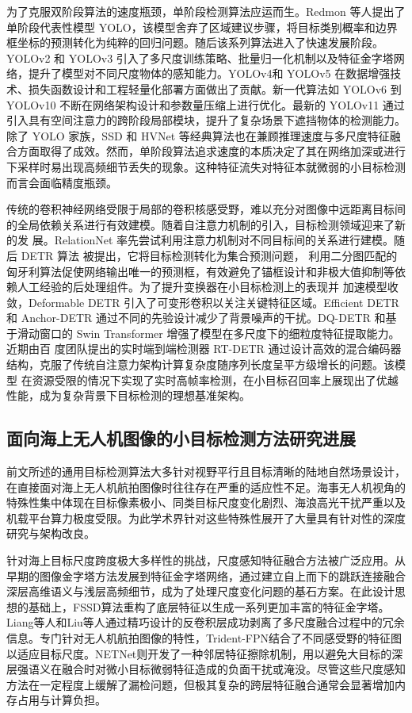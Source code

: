 为了克服双阶段算法的速度瓶颈，单阶段检测算法应运而生。Redmon 等人\cite{ref9}提出了单阶段代表性模型 YOLO，该模型舍弃了区域建议步骤，将目标类别概率和边界框坐标的预测转化为纯粹的回归问题。随后该系列算法进入了快速发展阶段。YOLOv2\cite{ref10} 和 YOLOv3\cite{ref11} 引入了多尺度训练策略、批量归一化机制以及特征金字塔网络，提升了模型对不同尺度物体的感知能力。YOLOv4\cite{ref12}和 YOLOv5\cite{ref13} 在数据增强技术、损失函数设计和工程轻量化部署方面做出了贡献。新一代算法如 YOLOv6\cite{ref14} 到 YOLOv10\cite{ref18} 不断在网络架构设计和参数量压缩上进行优化。最新的 YOLOv11 通过引入具有空间注意力的跨阶段局部模块，提升了复杂场景下遮挡物体的检测能力。除了 YOLO 家族，SSD\cite{ref19} 和 HVNet\cite{ref20} 等经典算法也在兼顾推理速度与多尺度特征融合方面取得了成效。然而，单阶段算法追求速度的本质决定了其在网络加深或进行下采样时易出现高频细节丢失的现象。这种特征流失对特征本就微弱的小目标检测而言会面临精度瓶颈。


传统的卷积神经网络受限于局部的卷积核感受野，难以充分对图像中远距离目标间的全局依赖关系进行有效建模。随着自注意力机制的引入，目标检测领域迎来了新的发
展。RelationNet\cite{ref21} 率先尝试利用注意力机制对不同目标间的关系进行建模。随后 DETR 算法\cite{ref22} 被提出，它将目标检测转化为集合预测问题，
利用二分图匹配的匈牙利算法促使网络输出唯一的预测框，有效避免了锚框设计和非极大值抑制等依赖人工经验的后处理组件。为了提升变换器在小目标检测上的表现并
加速模型收敛，Deformable DETR\cite{ref23} 引入了可变形卷积以关注关键特征区域。Efficient DETR\cite{ref24} 和 Anchor-DETR\cite{ref25} 通过不同的先验设计减少了背景噪声的干扰。DQ-DETR\cite{ref26} 和基于滑动窗口的 Swin Transformer\cite{ref27} 增强了模型在多尺度下的细粒度特征提取能力。近期由百
度团队提出的实时端到端检测器 RT-DETR\cite{ref28} 通过设计高效的混合编码器结构，克服了传统自注意力架构计算复杂度随序列长度呈平方级增长的问题。该模型
在资源受限的情况下实现了实时高帧率检测，在小目标召回率上展现出了优越性能，成为复杂背景下目标检测的理想基准架构。

\subsection{面向海上无人机图像的小目标检测方法研究进展}

前文所述的通用目标检测算法大多针对视野平行且目标清晰的陆地自然场景设计，在直接面对海上无人机航拍图像时往往存在严重的适应性不足。海事无人机视角的特殊性集中体现在目标像素极小、同类目标尺度变化剧烈、海浪高光干扰严重以及机载平台算力极度受限。为此学术界针对这些特殊性展开了大量具有针对性的深度研究与架构改良。

针对海上目标尺度跨度极大多样性的挑战，尺度感知特征融合方法被广泛应用。从早期的图像金字塔\cite{ref29, ref30}方法发展到特征金字塔网络\cite{ref31}，通过建立自上而下的跳跃连接融合深层高维语义与浅层高频细节，成为了处理尺度变化问题的基石方案。在此设计思想的基础上，FSSD\cite{ref32}算法重构了底层特征以生成一系列更加丰富的特征金字塔。Liang等人\cite{ref33}和Liu等人\cite{ref34}通过精巧设计的反卷积层成功剥离了多尺度融合过程中的冗余信息。专门针对无人机航拍图像的特性，Trident-FPN\cite{ref35}结合了不同感受野的特征图以适应目标尺度。NETNet\cite{ref36}则开发了一种邻居特征擦除机制，用以避免大目标的深层强语义在融合时对微小目标微弱特征造成的负面干扰或淹没。尽管这些尺度感知方法在一定程度上缓解了漏检问题，但极其复杂的跨层特征融合通常会显著增加内存占用与计算负担。

